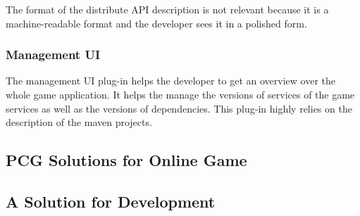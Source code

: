 The format of the distribute API description is not relevant because it is a
machine-readable format and the developer sees it in a polished form.

\subsubsection{Management UI}

The management UI plug-in helps the developer to get an overview over the whole
game application. It helps the manage the versions of services of the game
services as well as the versions of dependencies. This plug-in highly relies on
the description of the maven projects.

\subsection{PCG Solutions for Online Game}

\subsection{A Solution for \ms{} Development}